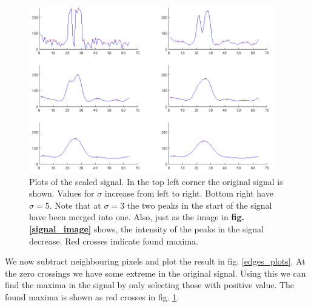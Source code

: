 \documentclass[a4paper, 10pt, final]{article}
\begin{document}
\begin{figure}[!h]
    \centering
    \includegraphics[angle=0,width=0.95\textwidth]{images/scale_signal}
    \caption{Plots of the scaled signal. In the top left corner the
    original signal is shown. Values for $\sigma$ increase from left to
    right. Bottom right have $\sigma = 5$. Note that at $\sigma = 3$ the
    two peaks in the start of the signal have been merged into one.
    Also, just as the image in \textbf{fig. \ref{signal_image}} shows,
    the intensity of the peaks in the signal decrease. Red crosses
    indicate found maxima.}
    \label{signal_plots}
\end{figure}

We now subtract neighbouring pixels and plot the result in fig.
\ref{edges_plots}. At the zero crossings we have some extreme in the
original signal. Using this we can find the maxima in the signal by only
selecting those with positive value. The found maxima is shown as red
crosses in fig. \ref{signal_plots}.
\end{document}
